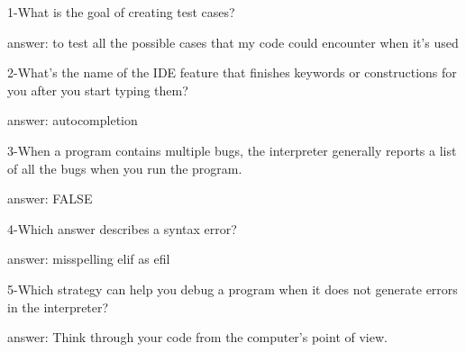 1-What is the goal of creating test cases?

answer: to test all the possible cases that my code could encounter when it's used

2-What's the name of the IDE feature that finishes keywords or constructions for you after you start typing them?

answer: autocompletion

3-When a program contains multiple bugs, the interpreter generally reports a list of all the bugs when you run the program.

answer: FALSE

4-Which answer describes a syntax error?

answer: misspelling elif as efil

5-Which strategy can help you debug a program when it does not generate errors in the interpreter?

answer: Think through your code from the computer's point of view.

